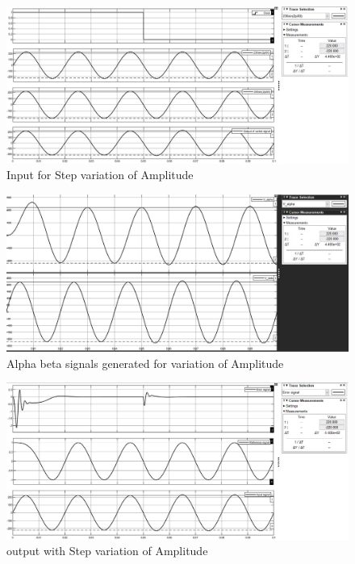 \documentclass[a4paper,12pt]{iitmdiss}
\begin{document}
\begin{figure}[hbt!]
    \centering
    \includegraphics[width=1.0\textwidth]{amp_input.jpg}
    \caption{Input for Step variation of Amplitude}
\end{figure}



\begin{figure}[hbt!]
    \centering
    \includegraphics[width=1.0\textwidth]{amp_alphabeta.jpg}
    \caption{Alpha beta signals generated for variation of Amplitude}
\end{figure}


\begin{figure}[hbt!]
    \centering
    \includegraphics[width=1.0\textwidth]{amp_output.jpg}
    \caption{output with Step variation of Amplitude}
\end{figure}
\end{document}
